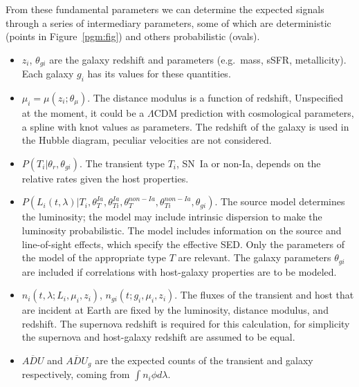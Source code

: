\documentclass[preprint]{elsarticle}
\begin{document}
From these fundamental parameters we can determine the expected
signals
through a series of intermediary parameters,
some of which are deterministic (points in Figure~\ref{pgm:fig}) and others
probabilistic (ovals).
\begin{itemize}
\item $z_i$, $\theta_{gi}$ are the galaxy redshift and parameters (e.g.\ mass, sSFR, metallicity).
Each galaxy $g_i$ has its values for these quantities.
\item $\mu_i=\mu(z_i; \theta_\mu)$.  The distance modulus is a function of redshift,
Unspecified at the moment,  it could
be a $\Lambda$CDM prediction with cosmological parameters, a spline with knot values
as parameters.
The redshift of the galaxy is used in the Hubble diagram, peculiar velocities are not considered.
\item $P(T_i | \theta_r, \theta_{gi})$.  The transient type $T_i$, SN~Ia or non-Ia, depends
on the relative rates given the host properties.
\item $P(L_i(t,\lambda)| T_i, \theta_T^{Ia}, \theta_{Ti}^{Ia}, \theta_T^{\mathit{non-Ia}}, \theta_{Ti}^{\mathit{non-Ia}},
\theta_{gi})$.  The source model determines
the luminosity; the model may include intrinsic dispersion to make the luminosity
probabilistic. The  model includes  information on the
source and line-of-sight effects, which specify the effective SED.   Only the
parameters of the model of the appropriate type $T$ are relevant.  The galaxy parameters
$\theta_{gi}$ are included if correlations with host-galaxy properties are to be modeled.
\item $n_i(t,\lambda; L_i, \mu_i, z_i)$, $n_{gi}(t; g_i, \mu_i, z_i)$.  The  fluxes of
the transient and host that are incident at Earth
are fixed by the luminosity, distance modulus, and redshift.
The supernova redshift is required for this calculation,
for simplicity the supernova and host-galaxy redshift are assumed to be equal.
\item $\overline{\mathit{ADU}}$ and
$\overline{\mathit{ADU}}_g$ are the expected counts of the transient and galaxy respectively,
coming from $\int n_i \phi d\lambda$.  
\end{itemize}
\end{document}
